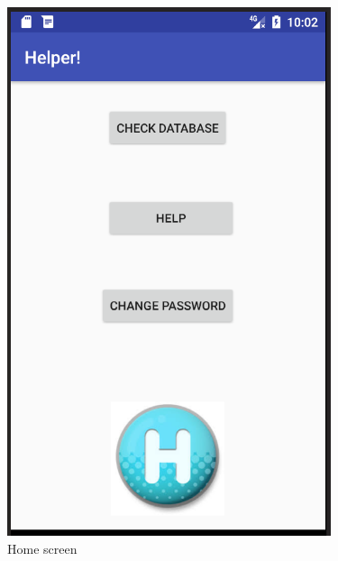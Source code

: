 		\begin{figure}[h!]
			\centering	
		\includegraphics[scale=0.8]{2.png} %
		\caption{Home screen}
		\label{fig:8} %
		
		\end{figure} 

